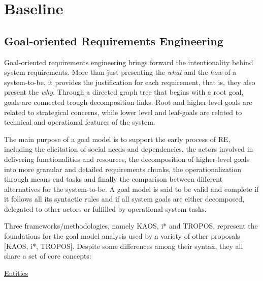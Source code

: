\chapter{Baseline}\label{ch:baseline}%

\section{Goal-oriented Requirements Engineering}

Goal-oriented requirements engineering brings forward the intentionality behind system requirements. More than just presenting the \textit{what} and the \textit{how} of a system-to-be, it provides the justification for each requirement, that is, they also present the \textit{why}. Through a directed graph tree that begins with a root goal, goals are connected trough decomposition links. Root and higher level goals are related to strategical concerns, while lower level and leaf-goals are related to technical and operational features of the system. 

The main purpose of a goal model is to support the early process of RE, including the elicitation of social needs and dependencies, the actors involved in delivering functionalities and resources, the decomposition of higher-level goals into more granular and detailed requirements chunks, the operationalization through means-end tasks and finally the comparison between different alternatives for the system-to-be. A goal model is said to be valid and complete if it follows all its syntactic rules and if all system goals are either decomposed, delegated to other actors or fulfilled by operational system tasks. 

Three frameworks/methodologies, namely KAOS, i* and TROPOS, represent the foundations for the goal model analysis used by a variety of other proposals [KAOS, i*, TROPOS]. Despite some differences among their syntax, they all share a set of core concepts:
\medskip

\large{\underline{Entities}}

